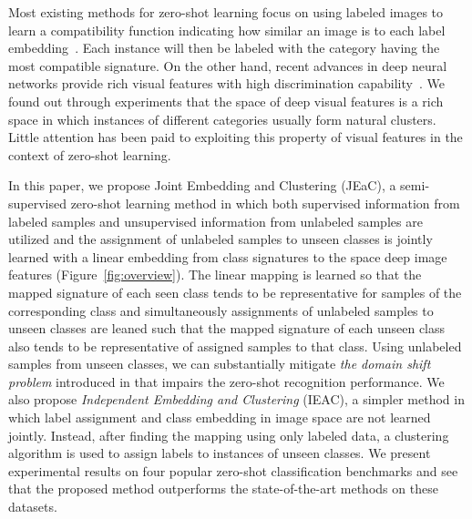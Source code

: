 \documentclass[letterpaper]{article}
\begin{document}
Most existing methods for zero-shot learning focus on using labeled images to learn a compatibility function indicating how similar an image is
to each label embedding~\cite{Akata2015,emb15,sse}. Each instance will then be labeled with the category having the most compatible signature.
 On the other hand, recent advances in deep neural networks provide rich visual features with high discrimination capability~\cite{vgg}.
We found out through experiments that the space of deep visual features is a rich space in which instances of different categories usually form natural clusters.
Little attention has been paid to exploiting this property of visual features in the context of zero-shot learning.


In this paper, we propose Joint Embedding and Clustering (JEaC),
a semi-supervised zero-shot learning method in which both supervised information from labeled samples
and unsupervised information from unlabeled samples are utilized and the assignment of unlabeled samples to unseen classes is jointly learned
with a linear embedding from class signatures to the space deep image features (Figure~\ref{fig:overview}).
The linear mapping is learned so that the mapped signature of each seen class tends to be representative
for samples of the corresponding class and simultaneously
assignments of unlabeled samples to unseen classes are leaned such that the mapped signature of each unseen class
 also tends to be representative of assigned samples to that class.
Using unlabeled samples from unseen classes, we can substantially mitigate
 \textit{the domain shift problem} introduced in \cite{eccv14} that impairs the zero-shot recognition performance.
We also propose \textit{Independent Embedding and Clustering} (IEAC),
a simpler method in which label assignment and class embedding in image space are not learned jointly.
Instead, after finding the mapping using only labeled data, a clustering algorithm is used to assign labels to instances of unseen classes.
We present experimental results on four popular zero-shot classification benchmarks
 and see that the proposed method outperforms the state-of-the-art methods on these datasets.
\end{document}
